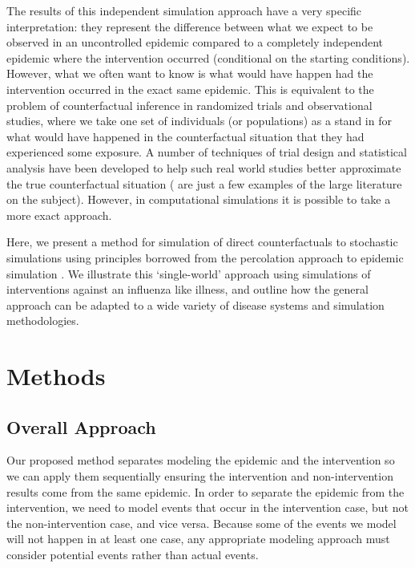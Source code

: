 \documentclass[PTRSB]{rsos}
\begin{document}
\begin{multicols}{2}
The results of this independent simulation approach have a very specific interpretation: they represent the difference between what we expect to be observed in an uncontrolled epidemic compared to a completely independent epidemic where the intervention occurred (conditional on the starting conditions).
However, what we often want to know is what would have happen had the intervention occurred in the exact same epidemic.
This is equivalent to the problem of counterfactual inference in randomized trials and observational studies, where we take one set of individuals (or populations) as a stand in for what would have happened in the counterfactual situation that they had experienced some exposure.
A number of techniques of trial design and statistical analysis have been developed to help such real world studies better approximate the true counterfactual situation (\cite{hudgens-halloran:2008,murray-et-al:2017,buchanan:2014} are just a few examples of the large literature on the subject).
However, in computational simulations it is possible to take a more exact approach.

Here, we present a method for simulation of direct counterfactuals to stochastic simulations using principles borrowed from the percolation approach to epidemic simulation \cite{miller-book}.
We illustrate this `single-world' approach using simulations of interventions against an influenza like illness, and outline how the general approach can be adapted to a wide variety of disease systems and simulation methodologies.

\section{Methods}

\subsection*{Overall Approach}
Our proposed method separates modeling the epidemic and the intervention so we can apply them sequentially ensuring the intervention and non-intervention results come from the same epidemic.
In order to separate the epidemic from the intervention, we need to model events that occur in the intervention case, but not the non-intervention case, and vice versa.
Because some of the events we model will not happen in at least one case, any appropriate modeling approach must consider potential events rather than actual events.


\end{multicols}
\end{document}
